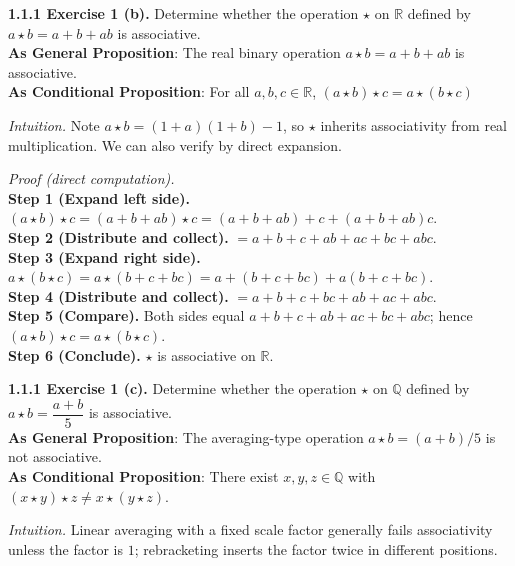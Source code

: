 \documentclass[12pt]{article}
\theoremstyle{definition}
\begin{document}
\noindent \textbf{1.1.1 Exercise 1 (b).} Determine whether the operation $\star$ on $\mathbb{R}$ defined by $a\star b=a+b+ab$ is associative.\\ %

\noindent\textbf{As General Proposition}: The real binary operation $a\star b=a+b+ab$ is associative.\\

\noindent \textbf{As Conditional Proposition}: For all $a,b,c\in\mathbb{R}$, $(a\star b)\star c=a\star(b\star c)$

\newpage

\dotfill

\emph{Intuition.} Note $a\star b=(1+a)(1+b)-1$, so $\star$ inherits associativity from real multiplication. We can also verify by direct expansion.\\

\dotfill

\emph{Proof (direct computation).}\\
\textbf{Step 1 (Expand left side).} $(a\star b)\star c=(a+b+ab)\star c=(a+b+ab)+c+(a+b+ab)c$.\\
\textbf{Step 2 (Distribute and collect).} $=a+b+c+ab+ac+bc+abc$.\\
\textbf{Step 3 (Expand right side).} $a\star(b\star c)=a\star(b+c+bc)=a+(b+c+bc)+a(b+c+bc)$.\\
\textbf{Step 4 (Distribute and collect).} $=a+b+c+bc+ab+ac+abc$.\\
\textbf{Step 5 (Compare).} Both sides equal $a+b+c+ab+ac+bc+abc$; hence $(a\star b)\star c=a\star(b\star c)$.\\
\textbf{Step 6 (Conclude).} $\star$ is associative on $\mathbb{R}$.\\


\newpage

\noindent \textbf{1.1.1 Exercise 1 (c).} Determine whether the operation $\star$ on $\mathbb{Q}$ defined by $a\star b=\dfrac{a+b}{5}$ is associative.\\ %

\noindent\textbf{As General Proposition}: The averaging-type operation $a\star b=(a+b)/5$ is not associative.\\

\noindent \textbf{As Conditional Proposition}: There exist $x,y,z\in\mathbb{Q}$ with $(x\star y)\star z\neq x\star (y\star z)$.

\newpage

\dotfill

\emph{Intuition.} Linear averaging with a fixed scale factor generally fails associativity unless the factor is $1$; rebracketing inserts the factor twice in different positions.\\
\end{document}
